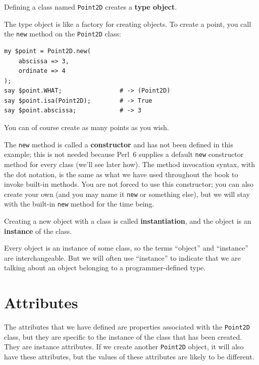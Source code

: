 Defining a class named {\tt Point2D} creates a {\bf type object}.

The type object is like a factory for creating objects.  To create 
a point, you call the {\tt new} method on the {\tt Point2D} class:

\begin{verbatim}
my $point = Point2D.new( 
    abscissa => 3, 
    ordinate => 4
);
say $point.WHAT;                # -> (Point2D)
say $point.isa(Point2D);        # -> True
say $point.abscissa;            # -> 3
\end{verbatim}
%
You can of course create as many points as you wish.

The {\tt new} method is called a {\bf constructor} and has not 
been defined in this example; this is not needed because 
Perl~6 supplies a default {\tt new} constructor method for 
every class (we'll see later how). The method invocation 
syntax, with the dot notation, is the same as what we have 
used throughout the book to invoke built-in methods. You 
are not forced to use this constructor; you can also create 
your own (and you may name it {\tt new} or something else), 
but we will stay with the built-in {\tt new} method for the 
time being.

Creating a new object with a class is called {\bf instantiation}, 
and the object is an {\bf instance} of the class.

Every object is an instance of some class, so the terms 
``object'' and ``instance'' are interchangeable.  But 
we will often use ``instance'' to indicate that we are 
talking about an object belonging to a programmer-defined type.

\section{Attributes}
\label{attributes}

The attributes that we have defined are properties associated 
with the {\tt Point2D} class, but they are specific to the 
instance of the class that has been created. They are 
instance attributes. If we create another {\tt Point2D} object, 
it will also have these attributes, but the values of 
these attributes are likely to be different. 

